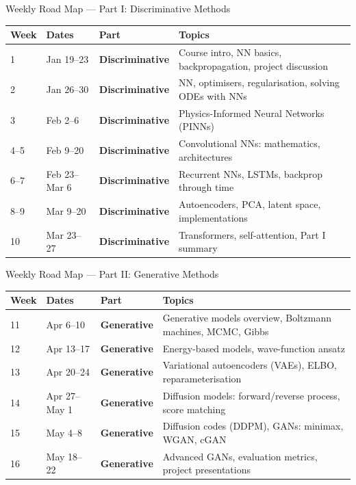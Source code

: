 \documentclass[aspectratio=169,11pt]{beamer}
\newcommand{\disctext}[1]{{\color{mlred}\textbf{#1}}}
\newcommand{\gentext}[1]{{\color{mlcoral}\textbf{#1}}}
\begin{document}
\begin{frame}{Weekly Road Map --- Part I: Discriminative Methods}
\begin{center}
\scriptsize
\renewcommand{\arraystretch}{1.30}
\begin{tabular}{@{}lll p{7.8cm}@{}}
  \toprule
  \textbf{Week} & \textbf{Dates} & \textbf{Part} & \textbf{Topics} \\
  \midrule
  1    & Jan 19--23    & \disctext{Discriminative}
       & Course intro, NN basics, backpropagation, project discussion \\
  2    & Jan 26--30    & \disctext{Discriminative}
       & NN, optimisers, regularisation, solving ODEs with NNs \\
  3    & Feb 2--6      & \disctext{Discriminative}
       & Physics-Informed Neural Networks (PINNs) \\
  4--5 & Feb 9--20     & \disctext{Discriminative}
       & Convolutional NNs: mathematics, architectures \\
  6--7 & Feb 23--Mar 6 & \disctext{Discriminative}
       & Recurrent NNs, LSTMs, backprop through time \\
  8--9 & Mar 9--20     & \disctext{Discriminative}
       & Autoencoders, PCA, latent space, implementations \\
  10   & Mar 23--27    & \disctext{Discriminative}
       & Transformers, self-attention, Part I summary \\
  \bottomrule
\end{tabular}
\end{center}
\end{frame}

\begin{frame}{Weekly Road Map --- Part II: Generative Methods}
\begin{center}
\scriptsize
\renewcommand{\arraystretch}{1.30}
\begin{tabular}{@{}lll p{7.8cm}@{}}
  \toprule
  \textbf{Week} & \textbf{Dates} & \textbf{Part} & \textbf{Topics} \\
  \midrule
  11   & Apr 6--10     & \gentext{Generative}
       & Generative models overview, Boltzmann machines, MCMC, Gibbs \\
  12   & Apr 13--17    & \gentext{Generative}
       & Energy-based models, wave-function ansatz \\
  13   & Apr 20--24    & \gentext{Generative}
       & Variational autoencoders (VAEs), ELBO, reparameterisation \\
  14   & Apr 27--May 1 & \gentext{Generative}
       & Diffusion models: forward/reverse process, score matching \\
  15   & May 4--8      & \gentext{Generative}
       & Diffusion codes (DDPM), GANs: minimax, WGAN, cGAN \\
  16   & May 18--22    & \gentext{Generative}
       & Advanced GANs, evaluation metrics, project presentations \\
  \bottomrule
\end{tabular}
\end{center}
\end{frame}
\end{document}
